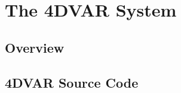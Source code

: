 
\chapter{The 4DVAR System} %

\section{Overview}

\section{4DVAR Source Code}


\ifpdf
    \graphicspath{{X/figures/PNG/}{X/figures/PDF/}{X/figures/}}
\else
    \graphicspath{{X/figures/EPS/}{X/figures/}}
\fi









